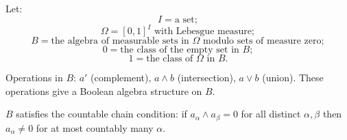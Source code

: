 Let:
$$I = \text{a set};$$
$$\Omega = [0, 1]^I \text{ with Lebesgue measure};$$
$$B = \text{the algebra of measurable sets in } \Omega \text{ modulo sets of measure zero};$$
$$0 = \text{the class of the empty set in } B;$$
$$1 = \text{the class of } \Omega \text{ in } B.$$

Operations in $B$: $a'$ (complement), $a \wedge b$ (intersection), $a \vee b$ (union). These operations give a Boolean algebra structure on $B$.

$B$ satisfies the countable chain condition: if $a_\alpha \wedge a_\beta = 0$ for all distinct $\alpha, \beta$ then $a_\alpha \neq 0$ for at most countably many $\alpha$.